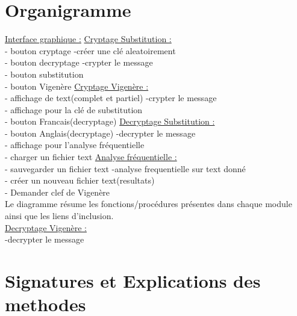 \documentclass[a4]{article}
\begin{document}
	\section{Organigramme}
			\underline{Interface graphique :}     \hspace{5cm}  \underline{Cryptage Substitution :}\\
			- bouton cryptage            \hspace{5.5cm}       -créer une clé aleatoirement\\
			- bouton decryptage         \hspace{5cm}        -crypter le message\\
			- bouton substitution\\
			- bouton Vigenère           \hspace{5.2cm}       \underline{Cryptage Vigenère :}\\
			- affichage de text(complet et partiel)  \hspace{2.2cm} -crypter le message\\
			- affichage pour la clé de substitution\\
			- bouton Francais(decryptage)   \hspace{3.5cm}     \underline{Decryptage Substitution :}\\
			- bouton Anglais(decryptage)    \hspace{3.5cm}     -decrypter le message\\
			- affichage pour l'analyse fréquentielle\\
			- charger un fichier text       \hspace{4.2cm}  \underline{Analyse fréquentielle :}\\
			- sauvegarder un fichier text     \hspace{3.8cm}  -analyse frequentielle sur text donné\\
			- créer un nouveau fichier text(resultats)\\
			- Demander clef de Vigenère\\
			
			Le diagramme résume les fonctions/procédures présentes dans chaque module ainsi que les liens d'inclusion.\\
			
			\underline{Decryptage Vigenère :}\\
			-decrypter le message
			
			
			
	\section{Signatures et Explications des methodes}
\end{document}
